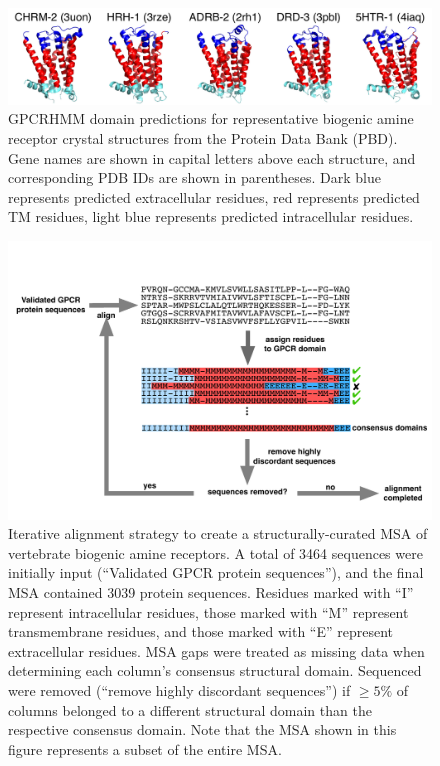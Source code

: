 \documentclass[fleqn,10pt]{wlpeerj}
\begin{document}
\newpage

\begin{figure}[htbp]
	\centerline{\includegraphics[width=15cm]{figures/pdb_gpcrhmm.pdf}}
	\caption{\label{pdb_gpcrhmm} GPCRHMM domain predictions for representative biogenic amine receptor crystal structures from the Protein Data Bank (PBD). Gene names are shown in capital letters above each structure, and corresponding PDB IDs are shown in parentheses. Dark blue represents predicted extracellular residues, red represents predicted TM residues, light blue represents predicted intracellular residues.}
\end{figure}



\begin{figure}[htbp]
	\centerline{\includegraphics[width=18cm]{figures/alignment_flowchart.pdf}}
	\caption{\label{flowchart} Iterative alignment strategy to create a structurally-curated MSA of vertebrate biogenic amine receptors. A total of 3464 sequences were initially input (``Validated GPCR protein sequences''), and the final MSA contained 3039 protein sequences. Residues marked with ``I'' represent intracellular residues, those marked with ``M'' represent transmembrane residues, and those marked with ``E'' represent extracellular residues. MSA gaps were treated as missing data when determining each column's consensus structural domain. Sequenced were removed (``remove highly discordant sequences'') if $\geq 5\%$ of columns belonged to a different structural domain than the respective consensus domain. Note that the MSA shown in this figure represents a subset of the entire MSA.}
\end{figure}
\end{document}
